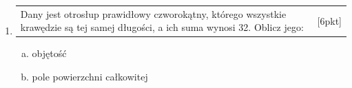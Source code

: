 \documentclass[12pt,a4paper]{article}
\begin{document}
\begin{enumerate}[1.]
		\item  \begin{tabular}{p{13cm} r}
			Dany jest otrosłup prawidłowy czworokątny, którego wszystkie krawędzie są tej samej długości, a ich suma wynosi 32. Oblicz jego:&[6pkt]\\ 
		\end{tabular}
	\begin{enumerate}[a)]
		\item objętość
		\item pole powierzchni całkowitej
	\end{enumerate}
		
		
		
	\end{enumerate}
	
\end{document}
